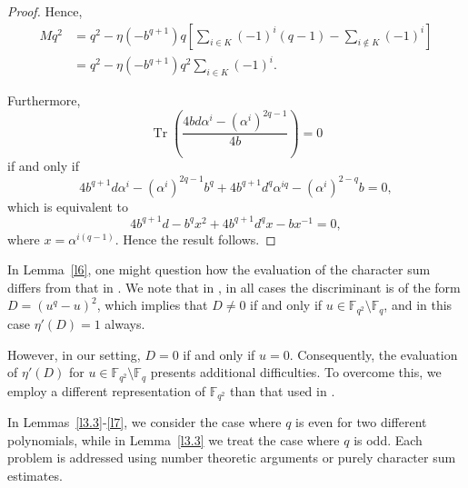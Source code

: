 \documentclass[12pt]{amsart}
\theoremstyle{definition}
\theoremstyle{remark}
\numberwithin{equation}{section}
\begin{document}
\begin{proof}
Hence,
\begin{align*}
Mq^2
&= q^2-\eta(-b^{q+1})q\left[\sum_{i \in K}(-1)^i(q-1)-\sum_{i \notin K}(-1)^i\right] \\
&= q^2-\eta(-b^{q+1})q^2\sum_{i \in K}(-1)^i.
\end{align*}

Furthermore,
$$
\operatorname{Tr}\left(\frac{4bd\alpha^i-(\alpha^i)^{2q-1}}{4b}\right)=0
$$
if and only if
$$
4b^{q+1}d\alpha^i-(\alpha^i)^{2q-1}b^q+4b^{q+1}d^q\alpha^{iq}-(\alpha^i)^{2-q}b=0,
$$
which is equivalent to
$$
4b^{q+1}d-b^q x^2+4b^{q+1}d^q x-bx^{-1}=0,
$$
where $x=\alpha^{i(q-1)}$. Hence the result follows.
\end{proof}
In Lemma~\ref{l6}, one might question how the evaluation of the character sum differs from that in \cite{r1}. We note that in \cite{r1}, in all cases the discriminant is of the form $D = (u^q - u)^2$, which implies that $D \neq 0$ if and only if $u \in \mathbb{F}_{q^2} \setminus \mathbb{F}_q$, and in this case $\eta'(D) = 1$ always. 

However, in our setting, $D = 0$ if and only if $u = 0$. Consequently, the evaluation of $\eta'(D)$ for $u \in \mathbb{F}_{q^2} \setminus \mathbb{F}_q$ presents additional difficulties. To overcome this, we employ a different representation of $\mathbb{F}_{q^2}$ than that used in \cite{r1}.

In Lemmas~\ref{l3.3}-\ref{l7}, we consider the case where $q$ is even for two different polynomials, while in Lemma~\ref{l3.3} we treat the case where $q$ is odd. Each problem is addressed using number theoretic arguments or purely character sum estimates.
\end{document}

